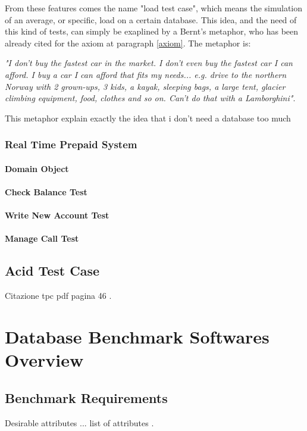 From these features comes the name "load test case", which means the simulation of an average, or specific, load on a certain database. This idea, and the need of this kind of tests,  can simply be exaplined by a Bernt's metaphor, who has been already cited for the axiom at paragraph \ref{axiom}. The metaphor is:

\emph{"I don't buy the fastest car in the market. I don't even buy the fastest car I can afford. I buy a car I can afford that fits my needs... e.g. drive to the northern Norway with 2 grown-ups, 3 kids, a kayak, sleeping bags, a large tent, glacier climbing equipment, food, clothes and so on. Can't do that with a Lamborghini"}\cite{Bernt}.

This metaphor explain exactly the idea that i don't need a database too much 

		\subsection{Real Time Prepaid System}
			\subsubsection{Domain Object}
			\subsubsection{Check Balance Test}
			\subsubsection{Write New Account Test}
			\subsubsection{Manage Call Test}
	\section{Acid Test Case}
Citazione tpc pdf pagina 46 \cite{TPC-C}.

\chapter{Database Benchmark Softwares Overview}
	\section{Benchmark Requirements}
Desirable attributes ... list of attributes \cite{tpc/sigmoid}.
	

